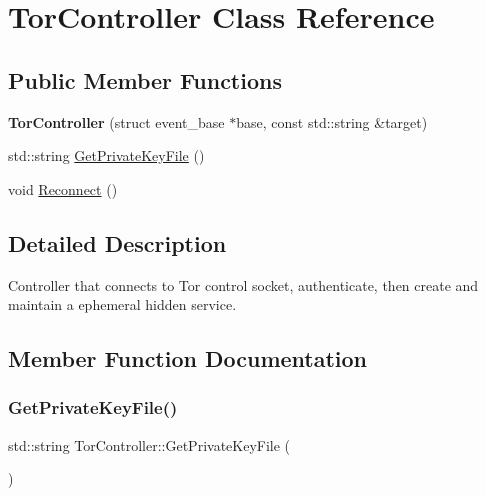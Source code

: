 \hypertarget{class_tor_controller}{}\section{Tor\+Controller Class Reference}
\label{class_tor_controller}
\subsection*{Public Member Functions}
\begin{DoxyCompactItemize}
\item 
\mbox{\label{class_tor_controller_ab38d90df15a9e3f2c6e1f4f24073a64e}} 
{\bfseries Tor\+Controller} (struct event\+\_\+base $\ast$base, const std\+::string \&target)
\item 
std\+::string \mbox{\hyperlink{class_tor_controller_a524481ece961670f745dbbfb4d9d5a33}{Get\+Private\+Key\+File}} ()
\item 
void \mbox{\hyperlink{class_tor_controller_ae5d4304836fce79574ec540c5ada8269}{Reconnect}} ()
\end{DoxyCompactItemize}


\subsection{Detailed Description}
Controller that connects to Tor control socket, authenticate, then create and maintain a ephemeral hidden service. 

\subsection{Member Function Documentation}
\mbox{\label{class_tor_controller_a524481ece961670f745dbbfb4d9d5a33}} 
\subsubsection{\texorpdfstring{Get\+Private\+Key\+File()}{GetPrivateKeyFile()}}
{\footnotesize\ttfamily std\+::string Tor\+Controller\+::\+Get\+Private\+Key\+File (\begin{DoxyParamCaption}{ }\end{DoxyParamCaption})}

